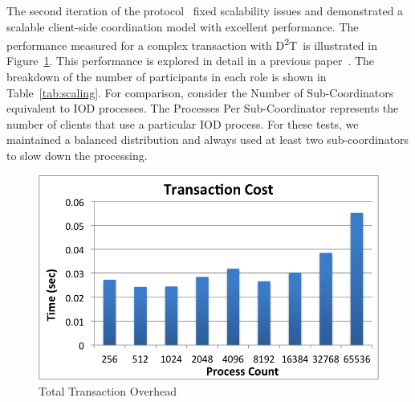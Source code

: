 \documentclass[conference]{IEEEtran}
\newcommand{\DDT}{D\textsuperscript{2}T~}
\begin{document}
The second iteration of the protocol~\cite{lofstead:2013:pdsw-txn} fixed
scalability issues and demonstrated a scalable client-side coordination model
with excellent performance. The performance measured for a complex transaction
with \DDT is illustrated in Figure~\ref{fig:performance}. This performance is
explored in detail in a previous paper~\cite{lofstead:2013:pdsw-txn}.
The
breakdown of the number of participants in each role is shown in
Table~\ref{tab:scaling}. For comparison, consider the Number of
Sub-Coordinators equivalent to IOD processes. The Processes Per Sub-Coordinator
represents the number of clients that use a particular IOD process. For these
tests, we maintained a balanced distribution and always used at least two
sub-coordinators to slow down the processing.

\begin{figure}[ht]
\centering
\includegraphics[keepaspectratio=true, width=\columnwidth]{images/performance}
\caption{Total Transaction Overhead}
\label{fig:performance}
\end{figure}
\end{document}
